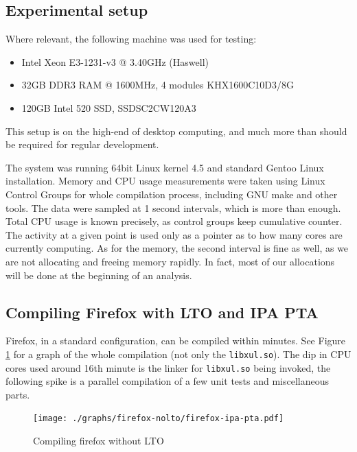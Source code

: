 \subsection{Experimental setup}

Where relevant, the following machine was used for testing:

\begin{itemize}
	\item Intel Xeon E3-1231-v3 @ 3.40GHz (Haswell)
	\item 32GB DDR3 RAM @ 1600MHz, 4 modules KHX1600C10D3/8G
	\item 120GB Intel 520 SSD, SSDSC2CW120A3
\end{itemize}

This setup is on the high-end of desktop computing, and much more than
should be required for regular development. 

The system was running 64bit Linux kernel 4.5 and standard Gentoo Linux
installation. Memory and CPU usage measurements were taken using Linux Control
Groups  for whole compilation process, including GNU make and other tools. The
data were sampled at 1 second intervals, which is more than enough. Total CPU
usage is known precisely, as control groups keep cumulative counter. The
activity at a given point is used only as a pointer as to how many cores are
currently computing. As for the memory, the second interval is fine as well, as
we are not allocating and freeing memory rapidly. In fact, most of our
allocations will be done at the beginning of an analysis.

\subsection{Compiling Firefox with LTO and IPA PTA}
\label{section-firefox-lto-pta}

Firefox, in a standard configuration, can be compiled within minutes. See Figure
\ref{figure-firefox-nolto} for a graph of the whole compilation (not only the
{\tt libxul.so}). The dip in CPU cores used around 16th minute is the linker for
{\tt libxul.so} being invoked, the following spike is a parallel compilation of a few
unit tests and miscellaneous parts.

\begin{figure}[h!]
	\centering
	\texttt{[image: ./graphs/firefox-nolto/firefox-ipa-pta.pdf]}
	\caption{Compiling firefox without LTO}
	\label{figure-firefox-nolto}
\end{figure}

